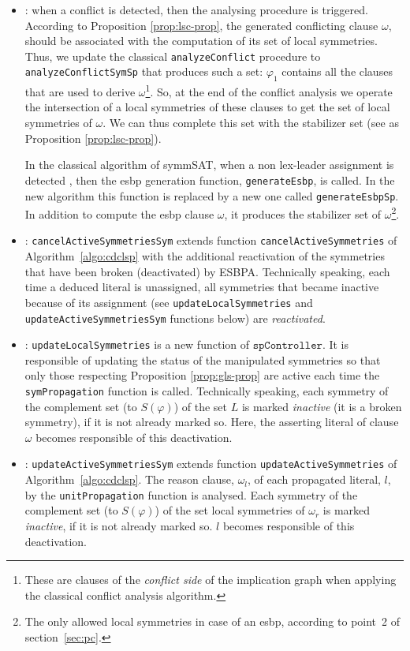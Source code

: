 \begin{itemize}[topsep=2pt]
	\item {}: when a conflict is detected, then the analysing
	procedure is triggered. According to Proposition \ref{prop:lsc-prop}, the
	generated conflicting clause $\omega$, should be associated with the
	computation of its set of local symmetries. Thus, we update the classical
	\texttt{analyzeConflict} procedure to \texttt{analyzeConflictSymSp} that produces such
	a set: $\varphi_1$ contains all the clauses that are used to derive $\omega$\footnote{These are clauses of the \textit{conflict side} of the implication graph when applying the classical conflict analysis algorithm.}. So, at the end of the conflict analysis we operate the intersection of a local symmetries of these clauses to get the set of local symmetries of $\omega$. We can thus complete this set with the stabilizer set (see as Proposition \ref{prop:lsc-prop}).
	
	In the classical algorithm of symmSAT, when a non lex-leader assignment is detected
	, then the esbp generation function, \texttt{generateEsbp}, is
	called. In the new algorithm this function is replaced by a new one called
	\texttt{generateEsbpSp}. In addition to compute the esbp clause $\omega$, it
	produces the stabilizer set of $\omega$\footnote{The only allowed
		local symmetries in case of an esbp, according to point~2 of
		section~\ref{sec:pc}.}.
	

	\item {}: \texttt{cancelActiveSymmetriesSym} extends function \texttt{cancelActiveSymmetries} of Algorithm~\ref{algo:cdclsp} with the additional reactivation of the symmetries that have been broken (deactivated) by ESBPA. Technically speaking, each time a deduced literal is unassigned, all symmetries that became inactive because of its assignment (see \texttt{updateLocalSymmetries} and \texttt{updateActiveSymmetriesSym} functions below) are \textit{reactivated}.
	
	\item {}: \texttt{updateLocalSymmetries} is a new function of
	$\texttt{spController}$. It is responsible of updating the status of the manipulated
	symmetries so that only those respecting Proposition \ref{prop:gls-prop} are
	active each time the \texttt{symPropagation} function is called. Technically speaking, each symmetry of the complement set (to $S(\varphi)$) of the set $L$ is marked \textit{inactive} (it is a broken symmetry), if it is not already marked so. Here, the asserting literal of clause $\omega$ becomes responsible of this deactivation. 
	
	\item {}: \texttt{updateActiveSymmetriesSym} extends function \texttt{updateActiveSymmetries} of Algorithm~\ref{algo:cdclsp}. The reason clause, $\omega_l$, of each propagated literal, $l$, by the \texttt{unitPropagation} function is analysed. Each symmetry of the complement set (to $S(\varphi)$) of the set local symmetries of $\omega_r$ is marked \textit{inactive}, if it is not already marked so. $l$ becomes responsible of this deactivation. 
\end{itemize}


